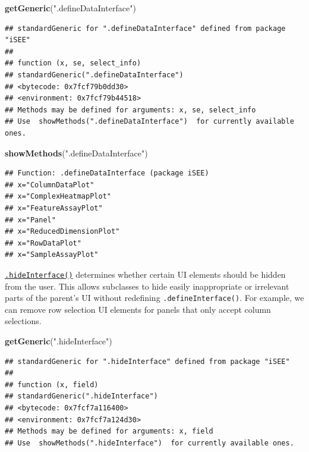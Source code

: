 \documentclass[
]{book}
\newenvironment{Shaded}{\begin{snugshade}}{\end{snugshade}}
\newcommand{\KeywordTok}[1]{\textcolor[rgb]{0.13,0.29,0.53}{\textbf{#1}}}
\newcommand{\NormalTok}[1]{#1}
\newcommand{\StringTok}[1]{\textcolor[rgb]{0.31,0.60,0.02}{#1}}
\begin{document}
\begin{Shaded}
\begin{Highlighting}[]
\KeywordTok{getGeneric}\NormalTok{(}\StringTok{".defineDataInterface"}\NormalTok{)}
\end{Highlighting}
\end{Shaded}

\begin{verbatim}
## standardGeneric for ".defineDataInterface" defined from package "iSEE"
## 
## function (x, se, select_info) 
## standardGeneric(".defineDataInterface")
## <bytecode: 0x7fcf79b0dd30>
## <environment: 0x7fcf79b44518>
## Methods may be defined for arguments: x, se, select_info
## Use  showMethods(".defineDataInterface")  for currently available ones.
\end{verbatim}

\begin{Shaded}
\begin{Highlighting}[]
\KeywordTok{showMethods}\NormalTok{(}\StringTok{".defineDataInterface"}\NormalTok{)}
\end{Highlighting}
\end{Shaded}

\begin{verbatim}
## Function: .defineDataInterface (package iSEE)
## x="ColumnDataPlot"
## x="ComplexHeatmapPlot"
## x="FeatureAssayPlot"
## x="Panel"
## x="ReducedDimensionPlot"
## x="RowDataPlot"
## x="SampleAssayPlot"
\end{verbatim}

\href{https://isee.github.io/iSEE/reference/interface-generics.html}{\texttt{.hideInterface()}} determines whether certain UI elements should be hidden from the user.
This allows subclasses to hide easily inappropriate or irrelevant parts of the parent's UI without redefining \texttt{.defineInterface()}.
For example, we can remove row selection UI elements for panels that only accept column selections.

\begin{Shaded}
\begin{Highlighting}[]
\KeywordTok{getGeneric}\NormalTok{(}\StringTok{".hideInterface"}\NormalTok{)}
\end{Highlighting}
\end{Shaded}

\begin{verbatim}
## standardGeneric for ".hideInterface" defined from package "iSEE"
## 
## function (x, field) 
## standardGeneric(".hideInterface")
## <bytecode: 0x7fcf7a116400>
## <environment: 0x7fcf7a124d30>
## Methods may be defined for arguments: x, field
## Use  showMethods(".hideInterface")  for currently available ones.
\end{verbatim}
\end{document}
